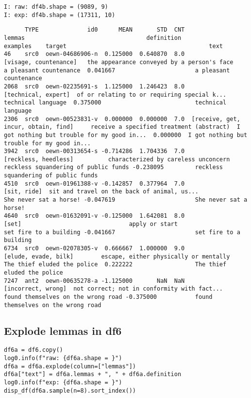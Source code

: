 \documentclass[a4paper,10pt,onecolumn,oneside,openright]{article}
\begin{document}
\begin{verbatim}
I: raw: df4b.shape = (9089, 9)
I: exp: df4b.shape = (17311, 10)
\end{verbatim}
\begin{verbatim}
      TYPE              id0      MEAN       STD  CNT                               lemmas                                   definition                                     examples    target                                         text
46    src0  oewn-04686906-n  0.125000  0.640870  8.0                [visage, countenance]   the appearance conveyed by a person's face                       a pleasant countenance  0.041667                       a pleasant countenance
2068  src0  oewn-02235691-s  1.125000  1.246423  8.0                  [technical, expert]  of or relating to or requiring special k...                           technical language  0.375000                           technical language
2306  src0  oewn-00523831-v  0.000000  0.000000  7.0  [receive, get, incur, obtain, find]     receive a specified treatment (abstract)  I got nothing but trouble for my good in...  0.000000  I got nothing but trouble for my good in...
3942  src0  oewn-00313654-s -0.714286  1.704336  7.0                 [reckless, heedless]          characterized by careless unconcern         reckless squandering of public funds -0.238095         reckless squandering of public funds
4510  src0  oewn-01961388-v -0.142857  0.377964  7.0                          [sit, ride]  sit and travel on the back of animal, us...                       She never sat a horse! -0.047619                       She never sat a horse!
4640  src0  oewn-01632091-v -0.125000  1.642081  8.0                                [set]                               apply or start                       set fire to a building -0.041667                       set fire to a building
6734  src0  oewn-02078305-v  0.666667  1.000000  9.0                 [elude, evade, bilk]        escape, either physically or mentally                  The thief eluded the police  0.222222                  The thief eluded the police
7247  ant2  oewn-00635278-a -1.125000       NaN  NaN                   [incorrect, wrong]  not correct; not in conformity with fact...           found themselves on the wrong road -0.375000           found themselves on the wrong road
\end{verbatim}
\subsection{Explode lemmas in df6}
\label{sec:orgdc6d73e}
\begin{verbatim}
df6a = df6.copy()
log0.info(f"raw: {df6a.shape = }")
df6a = df6a.explode(column=["lemmas"])
df6a["text"] = df6a.lemmas + ", " + df6a.definition
log0.info(f"exp: {df6a.shape = }")
disp_df(df6a.sample(n=8).sort_index())
\end{verbatim}
\end{document}
